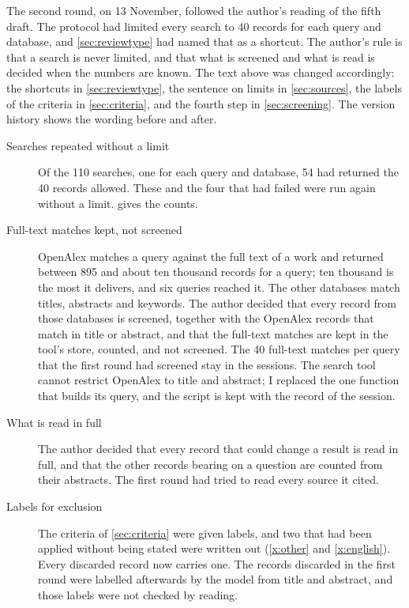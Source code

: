 The second round, on 13 November, followed the author's reading of the
fifth draft.
The protocol had limited every search to 40 records for each query and
database, and \cref{sec:reviewtype} had named that as a shortcut.
The author's rule is that a search is never limited, and that what is
screened and what is read is decided when the numbers are known.
The text above was changed accordingly: the shortcuts in
\cref{sec:reviewtype}, the sentence on limits in \cref{sec:sources},
the labels of the criteria in \cref{sec:criteria}, and the fourth step
in \cref{sec:screening}.
The version history shows the wording before and after.
\begin{description}
  \item[Searches repeated without a limit] Of the 110 searches, one for
    each query and database, 54 had returned the 40 records allowed.
    These and the four that had failed were run again without a limit.
     gives the counts.
  \item[Full-text matches kept, not screened] OpenAlex matches a query
    against the full text of a work and returned between 895 and about
    ten thousand records for a query; ten thousand is the most it
    delivers, and six queries reached it.
    The other databases match titles, abstracts and keywords.
    The author decided that every record from those databases is
    screened, together with the OpenAlex records that match in title or
    abstract, and that the full-text matches are kept in the tool's
    store, counted, and not screened.
    The 40 full-text matches per query that the first round had
    screened stay in the sessions.
    The search tool cannot restrict OpenAlex to title and abstract; I
    replaced the one function that builds its query, and the script is
    kept with the record of the session.
  \item[What is read in full] The author decided that every record
    that could change a result is read in full, and that the other
    records bearing on a question are counted from their abstracts.
    The first round had tried to read every source it cited.
  \item[Labels for exclusion] The criteria of \cref{sec:criteria} were
    given labels, and two that had been applied without being stated
    were written out (\ref{x:other} and \ref{x:english}).
    Every discarded record now carries one.
    The records discarded in the first round were labelled afterwards
    by the model from title and abstract, and those labels were not
    checked by reading.

\end{description}
